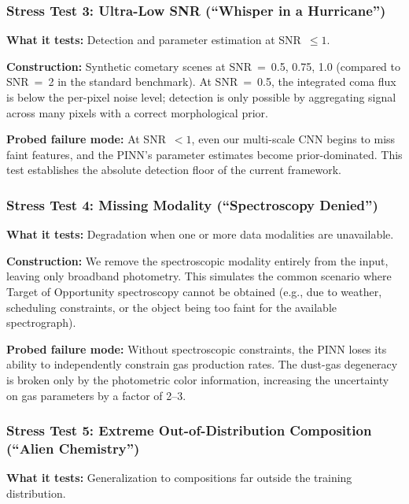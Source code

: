 \documentclass[usenatbib]{mnras}
\begin{document}
\subsubsection{Stress Test 3: Ultra-Low SNR (``Whisper in a Hurricane'')}

\textbf{What it tests:} Detection and parameter estimation at SNR~$\leq 1$.

\textbf{Construction:} Synthetic cometary scenes at SNR~=~0.5, 0.75, 1.0 (compared to SNR~=~2 in the standard benchmark). At SNR~=~0.5, the integrated coma flux is below the per-pixel noise level; detection is only possible by aggregating signal across many pixels with a correct morphological prior.

\textbf{Probed failure mode:} At SNR~$<1$, even our multi-scale CNN begins to miss faint features, and the PINN's parameter estimates become prior-dominated. This test establishes the absolute detection floor of the current framework.

\subsubsection{Stress Test 4: Missing Modality (``Spectroscopy Denied'')}

\textbf{What it tests:} Degradation when one or more data modalities are unavailable.

\textbf{Construction:} We remove the spectroscopic modality entirely from the input, leaving only broadband photometry. This simulates the common scenario where Target of Opportunity spectroscopy cannot be obtained (e.g., due to weather, scheduling constraints, or the object being too faint for the available spectrograph).

\textbf{Probed failure mode:} Without spectroscopic constraints, the PINN loses its ability to independently constrain gas production rates. The dust-gas degeneracy is broken only by the photometric color information, increasing the uncertainty on gas parameters by a factor of 2--3.

\subsubsection{Stress Test 5: Extreme Out-of-Distribution Composition (``Alien Chemistry'')}

\textbf{What it tests:} Generalization to compositions far outside the training distribution.
\end{document}
